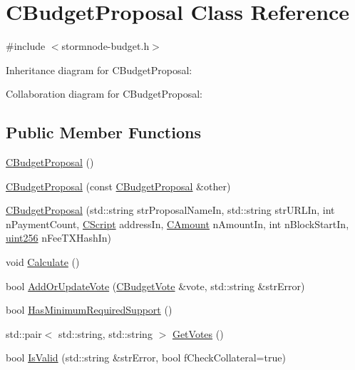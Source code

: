 \hypertarget{class_c_budget_proposal}{}\section{C\+Budget\+Proposal Class Reference}
\label{class_c_budget_proposal}


{\ttfamily \#include $<$stormnode-\/budget.\+h$>$}



Inheritance diagram for C\+Budget\+Proposal\+:


Collaboration diagram for C\+Budget\+Proposal\+:
\subsection*{Public Member Functions}
\begin{DoxyCompactItemize}
\item 
\hyperlink{class_c_budget_proposal_a30d26a2189f74f7c1f55db353569c366}{C\+Budget\+Proposal} ()
\item 
\hyperlink{class_c_budget_proposal_a82ffaf35b2494a9e499aa59df44be56d}{C\+Budget\+Proposal} (const \hyperlink{class_c_budget_proposal}{C\+Budget\+Proposal} \&other)
\item 
\hyperlink{class_c_budget_proposal_a8d1de8e78ea83c897e89e0046fa3172e}{C\+Budget\+Proposal} (std\+::string str\+Proposal\+Name\+In, std\+::string str\+U\+R\+L\+In, int n\+Payment\+Count, \hyperlink{class_c_script}{C\+Script} address\+In, \hyperlink{amount_8h_a4eaf3a5239714d8c45b851527f7cb564}{C\+Amount} n\+Amount\+In, int n\+Block\+Start\+In, \hyperlink{classuint256}{uint256} n\+Fee\+T\+X\+Hash\+In)
\item 
void \hyperlink{class_c_budget_proposal_a62e5e004af90cfce33eddef90dcdb7e2}{Calculate} ()
\item 
bool \hyperlink{class_c_budget_proposal_ad153df04aa541d0c06eb068d79d0cf96}{Add\+Or\+Update\+Vote} (\hyperlink{class_c_budget_vote}{C\+Budget\+Vote} \&vote, std\+::string \&str\+Error)
\item 
bool \hyperlink{class_c_budget_proposal_a839252a583d69a6d4301aa613fceab14}{Has\+Minimum\+Required\+Support} ()
\item 
std\+::pair$<$ std\+::string, std\+::string $>$ \hyperlink{class_c_budget_proposal_a60b112e2960d824dfcc8bc78414c09cc}{Get\+Votes} ()
\item 
bool \hyperlink{class_c_budget_proposal_afaa5e910085e8f0aea26aad6fa99ed2b}{Is\+Valid} (std\+::string \&str\+Error, bool f\+Check\+Collateral=true)

\end{DoxyCompactItemize}
